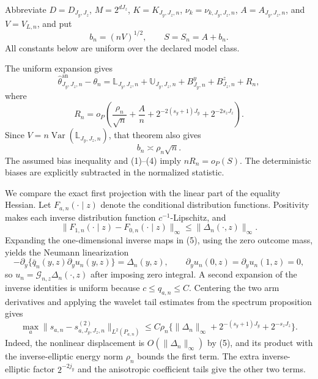 Abbreviate \(D=D_{J_y,J_z}\), \(M=2^{dJ_z}\), \(K=K_{J_y,J_z,n}\), \(\nu_k=\nu_{k,J_y,J_z,n}\), \(A=A_{J_y,J_z,n}\), and \(V=V_{L,n}\), and put
\[
b_n=(nV)^{1/2},\qquad S=S_n=A+b_n.                                         \tag{1}
\]
All constants below are uniform over the declared model class.

The uniform expansion gives
\[
\widehat\theta^{\mathrm{an}}_{J_y,J_z,n}-\theta_n
=\mathbb L_{J_y,J_z,n}+\mathbb U_{J_y,J_z,n}
+B^y_{J_y,n}+B^z_{J_z,n}+R_n,                                             \tag{2}
\]
where
\[
R_n=o_P\!\left(\frac{\rho_n}{\sqrt n}+\frac A n
+2^{-2(s_y+1)J_y}+2^{-2s_zJ_z}\right).                                   \tag{3}
\]
Since \(V=n\operatorname{Var}(\mathbb L_{J_y,J_z,n})\), that theorem also gives
\[
b_n\asymp\rho_n\sqrt n.                                                   \tag{4}
\]
The assumed bias inequality and (1)--(4) imply \(nR_n=o_P(S)\).  The deterministic biases are explicitly subtracted in the normalized statistic.

We compare the exact first projection with the linear part of the equality Hessian.  Let \(F_{a,n}(\cdot\mid z)\) denote the conditional distribution functions.  Positivity makes each inverse distribution function \(c^{-1}\)-Lipschitz, and
\[
\|F_{1,n}(\cdot\mid z)-F_{0,n}(\cdot\mid z)\|_\infty
\le\|\Delta_n(\cdot,z)\|_\infty.                                        \tag{5}
\]
Expanding the one-dimensional inverse maps in (5), using the zero outcome mass, yields the Neumann linearization
\[
-\partial_y\{\bar q_n(y,z)\partial_yu_n(y,z)\}=\Delta_n(y,z),
\qquad \partial_yu_n(0,z)=\partial_yu_n(1,z)=0,                            \tag{6}
\]
so \(u_n=\mathcal G_{n,z}\Delta_n(\cdot,z)\) after imposing zero integral.  A second expansion of the inverse identities is uniform because \(c\le q_{a,n}\le C\).  Centering the two arm derivatives and applying the wavelet tail estimates from the spectrum proposition gives
\[
\max_a\|s_{a,n}-s^{(2)}_{a,J_y,J_z,n}\|_{L^2(P_{a,n})}
\le C\rho_n\{\|\Delta_n\|_\infty
+2^{-(s_y+1)J_y}+2^{-s_zJ_z}\}.                                          \tag{7}
\]
Indeed, the nonlinear displacement is \(O(\|\Delta_n\|_\infty)\) by (5), and its product with the inverse-elliptic energy norm \(\rho_n\) bounds the first term.  The extra inverse-elliptic factor \(2^{-2j_y}\) and the anisotropic coefficient tails give the other two terms.

